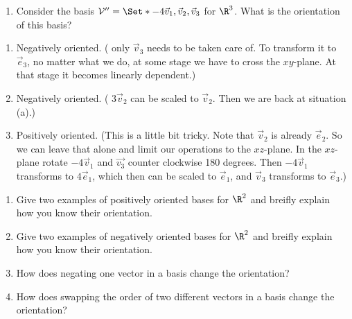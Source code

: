 \begin{exercises}
\begin{problist}
\begin{enumerate}
			\item Consider the basis $\mathcal V'' = \Set*{-4\vec v_1,
				\vec v_2, \vec v_3}$ for $\R^{3}$. What is the
				orientation of this basis?
		\end{enumerate}
		\begin{solution}
			\begin{enumerate}
				\item Negatively oriented. ( only $\vec{v}_3$ needs to be taken care of. To transform it to $\vec{e}_3$, no matter what we do,
					at some stage we have to cross the $xy$-plane. At that stage it becomes linearly dependent.)
				\item Negatively oriented. ( $3\vec{v}_2$ can be scaled to $\vec{v}_2$. Then we are back at situation (a).)
				\item Positively oriented. (This is a little bit tricky. Note that $\vec{v}_2$ is already $\vec{e}_2$. So we can leave that 
					alone and limit our operations to the $xz$-plane. In the $xz$-plane rotate $-4 \vec{v}_1$ and $\vec{v_3}$ counter 
					clockwise 180 degrees. Then $-4 \vec{v}_1$ transforms to $4 \vec{e}_1$, which then can be scaled to $\vec{e}_1$, and 
					$\vec{v}_3$ transforms to $\vec{e}_3$.)
			\end{enumerate}
		\end{solution}

		\prob
		\begin{enumerate}
			\item Give two examples of positively oriented bases for
				$\R^{2}$ and breifly explain how you know their orientation.

			\item Give two examples of negatively oriented bases for
				$\R^{2}$ and breifly explain how you know their orientation.

			\item How does negating one vector in a basis change the
				orientation?

			\item How does swapping the order of two different vectors
				in a basis change the orientation?
		\end{enumerate}
	\end{problist}
\end{exercises}
